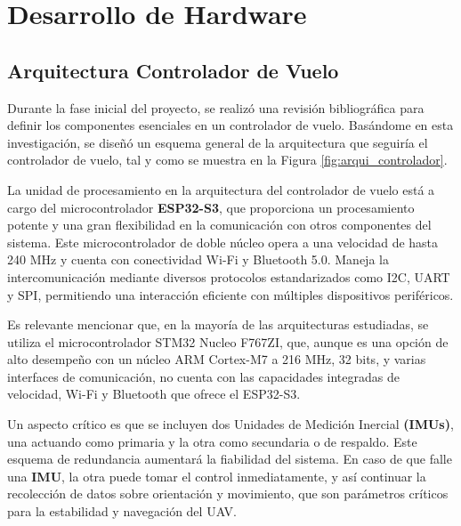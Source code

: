 


\section{Desarrollo de Hardware}
    \subsection{Arquitectura Controlador de Vuelo}
        \vspace{5px}
        Durante la fase inicial del proyecto, se realizó una revisión bibliográfica para definir los componentes esenciales en un controlador de vuelo. Basándome en esta investigación, se diseñó un esquema general de la arquitectura que seguiría el controlador de vuelo, tal y como se muestra en la Figura \ref{fig:arqui_controlador}.
        \vspace{5px}

        La unidad de procesamiento en la arquitectura del controlador de vuelo está a cargo del microcontrolador \textbf{ESP32-S3}, que proporciona un procesamiento potente y una gran flexibilidad en la comunicación con otros componentes del sistema. Este microcontrolador de doble núcleo opera a una velocidad de hasta 240 MHz y cuenta con conectividad Wi-Fi y Bluetooth 5.0. Maneja la intercomunicación mediante diversos protocolos estandarizados como I2C, UART y SPI, permitiendo una interacción eficiente con múltiples dispositivos periféricos.
        \vspace{5px}

        Es relevante mencionar que, en la mayoría de las arquitecturas estudiadas, se utiliza el microcontrolador STM32 Nucleo F767ZI, que, aunque es una opción de alto desempeño con un núcleo ARM Cortex-M7 a 216 MHz, 32 bits, y varias interfaces de comunicación, no cuenta con las capacidades integradas de velocidad, Wi-Fi y Bluetooth que ofrece el ESP32-S3. \vspace{5px}

        Un aspecto crítico es que se incluyen dos Unidades de Medición Inercial \textbf{(IMUs)}, una actuando como primaria y la otra como secundaria o de respaldo. Este esquema de redundancia aumentará la fiabilidad del sistema. En caso de que falle una \textbf{IMU}, la otra puede tomar el control inmediatamente, y así continuar la recolección de datos sobre orientación y movimiento, que son parámetros críticos para la estabilidad y navegación del UAV.
        \vspace{5 px}

